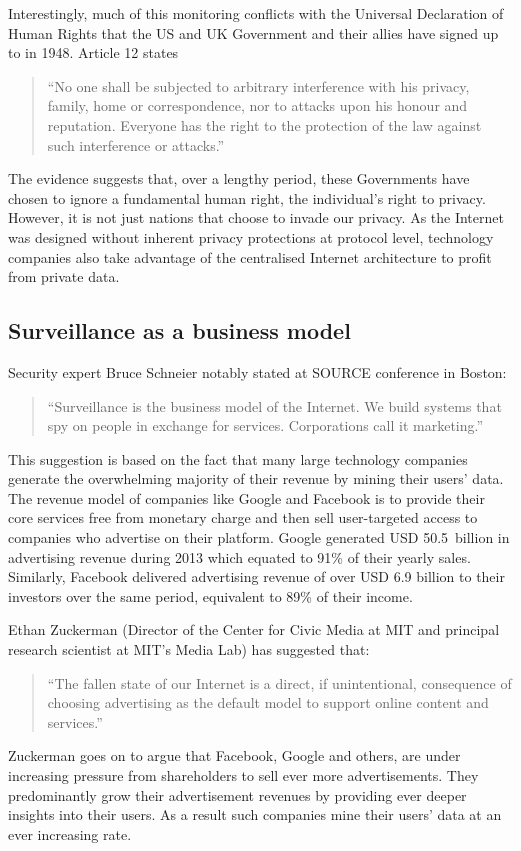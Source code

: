 \documentclass[twocolumn,english]{article}
\begin{document}
Interestingly, much of this monitoring conflicts with the Universal
Declaration of Human Rights that the US and UK Government and their
allies have signed up to in 1948. Article 12 states\cite{unhrd12}
\begin{quote}
\textquotedblleft No one shall be subjected to arbitrary interference
with his privacy, family, home or correspondence, nor to attacks upon
his honour and reputation. Everyone has the right to the protection
of the law against such interference or attacks.\textquotedblright
\end{quote}
The evidence suggests that, over a lengthy period, these Governments
have chosen to ignore a fundamental human right, the individual's right
to privacy. However, it is not just nations that choose to invade
our privacy.  As the Internet was designed without inherent privacy protections at protocol level, technology companies also take advantage of the centralised Internet architecture to profit from private data.

\subsection{Surveillance as a business model }

Security expert Bruce Schneier notably stated at SOURCE conference in Boston:\cite{boston14}
\begin{quote}
\textquotedblleft Surveillance is the business model of the Internet. We build systems that spy on people in exchange for services. Corporations call it marketing.\textquotedblright
\end{quote}
This suggestion is based on the fact that many large technology
companies generate the overwhelming majority of their revenue by
mining their users' data. The revenue model of companies like Google
and Facebook is to provide their core services free from monetary
charge and then sell user-targeted access to companies who advertise on their platform. Google generated USD 50.5~billion in advertising
revenue during 2013 which equated to 91\% of their yearly sales\cite{google13}. Similarly, Facebook delivered advertising revenue of over USD 6.9
billion to their investors over the same period, equivalent to 89\%
of their income\cite{facebook13}. 

Ethan Zuckerman (Director of the Center for Civic Media at MIT and
principal research scientist at MIT\textquoteright s Media Lab) has
suggested that\cite{zuckerman14}:
\begin{quote}
\textquotedblleft The fallen state of our Internet is a direct, if
unintentional, consequence of choosing advertising as the default
model to support online content and services.\textquotedblright 
\end{quote}
Zuckerman goes on to argue that Facebook, Google and others, are under
increasing pressure from shareholders to sell ever more advertisements.
They predominantly grow their advertisement revenues by providing ever deeper insights into their users.  As a result such companies mine their users' data at an ever increasing rate.
\end{document}

